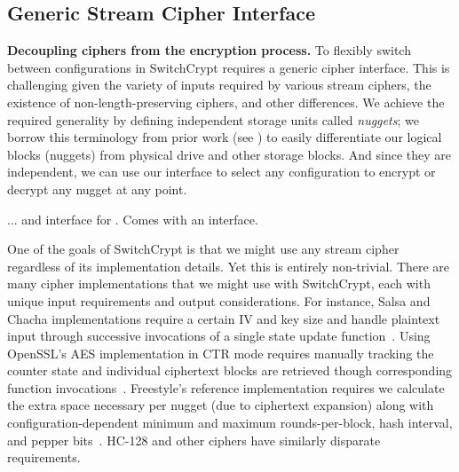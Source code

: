 


\subsection{Generic Stream Cipher Interface} \label{subsec:interface}



\textbf{Decoupling ciphers from the encryption process.} To flexibly switch
between configurations in SwitchCrypt requires a generic cipher interface. This
is challenging given the variety of inputs required by various stream ciphers,
the existence of non-length-preserving ciphers, and other differences. We
achieve the required generality by defining independent storage units called
\emph{nuggets}; we borrow this terminology from prior work (see
\cite{StrongBox}) to easily differentiate our logical blocks (nuggets) from
physical drive and other storage blocks. And since they are independent, we can
use our interface to select any configuration to encrypt or decrypt any nugget
at any point.

... and interface for \sysB.  Comes with an interface.


One of the goals of SwitchCrypt is that we might use any stream cipher
regardless of its implementation details. Yet this is entirely non-trivial.
There are many cipher implementations that we might use with SwitchCrypt, each
with unique input requirements and output considerations. For instance, Salsa
and Chacha implementations require a certain IV and key size and handle
plaintext input through successive invocations of a single state update
function~\cite{Floodyberry}. Using OpenSSL's AES implementation in CTR mode
requires manually tracking the counter state and individual ciphertext blocks
are retrieved though corresponding function invocations~\cite{OpenSSL}.
Freestyle's reference implementation requires we calculate the extra space
necessary per nugget (due to ciphertext expansion) along with
configuration-dependent minimum and maximum rounds-per-block, hash interval, and
pepper bits~\cite{Freestyle}. HC-128 and other ciphers have similarly disparate
requirements.


